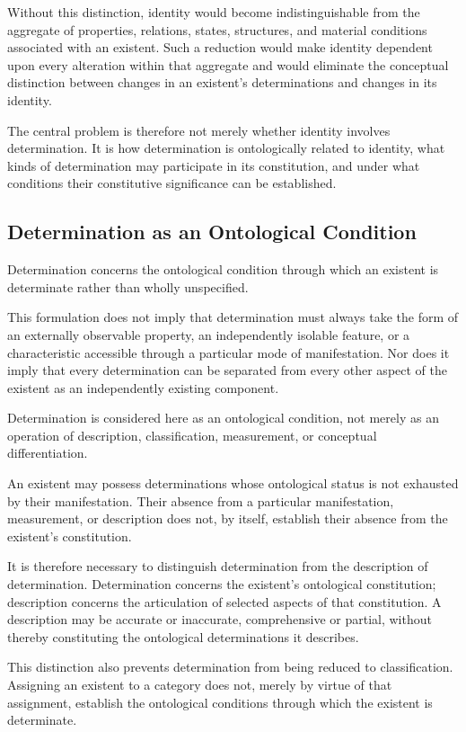 Without this distinction, identity would become indistinguishable
from the aggregate of properties, relations, states, structures,
and material conditions associated with an existent. Such a
reduction would make identity dependent upon every alteration
within that aggregate and would eliminate the conceptual
distinction between changes in an existent's determinations
and changes in its identity.

The central problem is therefore not merely whether identity
involves determination. It is how determination is ontologically
related to identity, what kinds of determination may participate
in its constitution, and under what conditions their constitutive
significance can be established.

\subsection{Determination as an Ontological Condition}

Determination concerns the ontological condition through which
an existent is determinate rather than wholly unspecified.

This formulation does not imply that determination must always
take the form of an externally observable property, an
independently isolable feature, or a characteristic accessible
through a particular mode of manifestation. Nor does it imply
that every determination can be separated from every other
aspect of the existent as an independently existing component.

Determination is considered here as an ontological condition,
not merely as an operation of description, classification,
measurement, or conceptual differentiation.

An existent may possess determinations whose ontological
status is not exhausted by their manifestation. Their absence
from a particular manifestation, measurement, or description
does not, by itself, establish their absence from the existent's
constitution.

It is therefore necessary to distinguish determination from
the description of determination. Determination concerns the
existent's ontological constitution; description concerns the
articulation of selected aspects of that constitution. A
description may be accurate or inaccurate, comprehensive or
partial, without thereby constituting the ontological
determinations it describes.

This distinction also prevents determination from being
reduced to classification. Assigning an existent to a category
does not, merely by virtue of that assignment, establish the
ontological conditions through which the existent is determinate.

